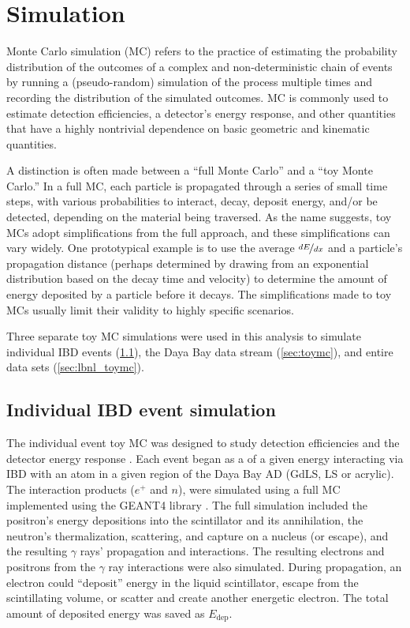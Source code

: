 \chapter{Simulation}
\label{ch:simulation}

Monte Carlo simulation (MC) refers to the practice
of estimating the probability distribution of the outcomes
of a complex and non-deterministic chain of events
by running a (pseudo-random) simulation of the process multiple times
and recording the distribution of the simulated outcomes.
MC is commonly used to estimate detection efficiencies,
a detector's energy response,
and other quantities that have a highly nontrivial dependence
on basic geometric and kinematic quantities.

A distinction is often made between a ``full Monte Carlo''
and a ``toy Monte Carlo.''
In a full MC, each particle is propagated through a series of small time steps,
with various probabilities to interact, decay, deposit energy, and/or be detected,
depending on the material being traversed.
As the name suggests, toy MCs adopt simplifications from the full approach,
and these simplifications can vary widely.
One prototypical example is to use the average $\nicefrac{dE}{dx}$
and a particle's propagation distance
(perhaps determined by drawing from an exponential distribution
based on the decay time and velocity)
to determine the amount of energy deposited by a particle
before it decays.
The simplifications made to toy MCs usually limit their validity
to highly specific scenarios.

Three separate toy MC simulations were used in this analysis
to simulate individual IBD events (\cref{sec:thu_toymc}),
the Daya Bay data stream (\cref{sec:toymc}),
and entire data sets (\cref{sec:lbnl_toymc}).

\section{Individual IBD event simulation}
\label{sec:thu_toymc}

The individual event toy MC was designed
to study detection efficiencies and the detector energy response \cite{nh2016technote}.
Each event began as a \nuebar{} of a given energy interacting via IBD
with an atom in a given region of the Daya Bay AD
(GdLS, LS or acrylic).
The interaction products ($e^+$ and $n$),
were simulated using a full MC implemented using the GEANT4 library \cite{geant4}.
The full simulation included
the positron's energy depositions into the scintillator
and its annihilation,
the neutron's thermalization, scattering, and capture on a nucleus (or escape),
and the resulting $\gamma$ rays' propagation and interactions.
The resulting electrons and positrons from the $\gamma$ ray interactions
were also simulated.
During propagation, an electron could
``deposit'' energy in the liquid scintillator,
escape from the scintillating volume,
or scatter and create another energetic electron.
The total amount of deposited energy was saved as $E_{\text{dep}}$.

